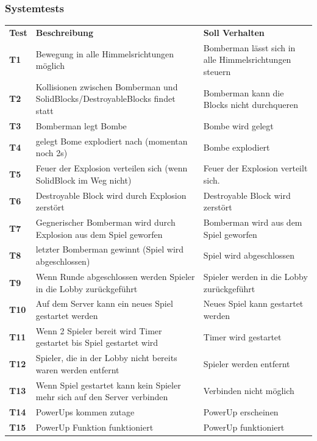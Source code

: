 \documentclass[11pt]{scrartcl}
\begin{document}
\subsubsection{Systemtests}
\begin{tabularx}{\linewidth}{l X X}
  \bf{Test} & \bf{Beschreibung} & \bf{Soll Verhalten} \\
  \bf{T1} & Bewegung in alle Himmelsrichtungen möglich & 
  Bomberman lässt sich in alle Himmelsrichtungen steuern\\
  \bf{T2} & Kollisionen zwischen Bomberman und SolidBlocks/DestroyableBlocks 
  findet statt & Bomberman kann die Blocks nicht durchqueren \\
  \bf{T3} & Bomberman legt Bombe & Bombe wird gelegt \\
  \bf{T4} & gelegt Bome explodiert nach (momentan noch 2s) & Bombe explodiert \\
  \bf{T5} & Feuer der Explosion verteilen sich (wenn SolidBlock im Weg nicht) & Feuer der 
  Explosion verteilt sich.\\
  \bf{T6} & Destroyable Block wird durch Explosion zerstört & Destroyable Block wird 
  zerstört \\
  \bf{T7} & Gegnerischer Bomberman wird durch Explosion aus dem Spiel geworfen & 
  Bomberman wird aus dem Spiel geworfen\\
  \bf{T8} & letzter Bomberman gewinnt (Spiel wird abgeschlossen) & Spiel wird 
  abgeschlossen \\
  \bf{T9} & Wenn Runde abgeschlossen werden Spieler in die Lobby zurückgeführt & 
  Spieler werden in die Lobby zurückgeführt \\
  \bf{T10} & Auf dem Server kann ein neues Spiel gestartet werden & Neues Spiel 
  kann gestartet werden \\
  \bf{T11} & Wenn 2 Spieler bereit wird Timer gestartet bis Spiel gestartet 
  wird & Timer wird gestartet \\
  \bf{T12} & Spieler, die in der Lobby nicht bereits waren werden entfernt & 
  Spieler werden entfernt \\
  \bf{T13} & Wenn Spiel gestartet kann kein Spieler mehr sich auf den Server 
  verbinden & Verbinden nicht möglich \\
  \bf{T14} & PowerUps kommen zutage & PowerUp erscheinen \\
  \bf{T15} & PowerUp Funktion funktioniert & PowerUp funktioniert \\
\end{tabularx}
\end{document}
